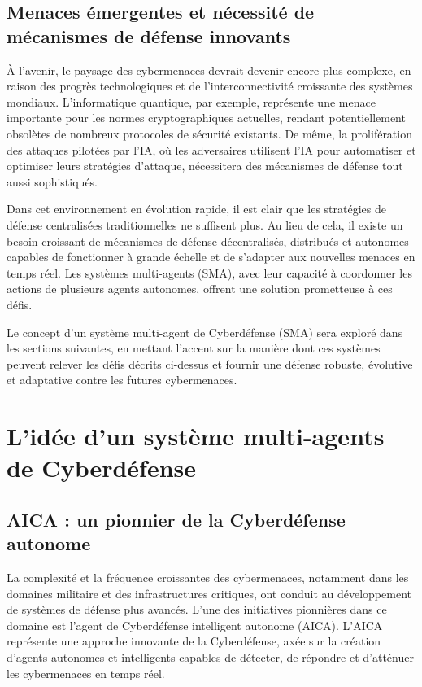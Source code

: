 \subsection{Menaces émergentes et nécessité de mécanismes de défense innovants}

À l'avenir, le paysage des cybermenaces devrait devenir encore plus complexe, en raison des progrès technologiques et de l'interconnectivité croissante des systèmes mondiaux. L'informatique quantique, par exemple, représente une menace importante pour les normes cryptographiques actuelles, rendant potentiellement obsolètes de nombreux protocoles de sécurité existants\cite{mosca2018cybersecurity}\cite{bernstein2017post}. De même, la prolifération des attaques pilotées par l'IA, où les adversaires utilisent l'IA pour automatiser et optimiser leurs stratégies d'attaque, nécessitera des mécanismes de défense tout aussi sophistiqués\cite{brundage2018malicious}.

Dans cet environnement en évolution rapide, il est clair que les stratégies de défense centralisées traditionnelles ne suffisent plus. Au lieu de cela, il existe un besoin croissant de mécanismes de défense décentralisés, distribués et autonomes capables de fonctionner à grande échelle et de s'adapter aux nouvelles menaces en temps réel. Les systèmes multi-agents (SMA), avec leur capacité à coordonner les actions de plusieurs agents autonomes, offrent une solution prometteuse à ces défis.

Le concept d'un système multi-agent de Cyberdéfense (SMA) sera exploré dans les sections suivantes, en mettant l'accent sur la manière dont ces systèmes peuvent relever les défis décrits ci-dessus et fournir une défense robuste, évolutive et adaptative contre les futures cybermenaces.


\section{L'idée d'un système multi-agents de Cyberdéfense}

\subsection{AICA : un pionnier de la Cyberdéfense autonome}

La complexité et la fréquence croissantes des cybermenaces, notamment dans les domaines militaire et des infrastructures critiques, ont conduit au développement de systèmes de défense plus avancés. L'une des initiatives pionnières dans ce domaine est l'agent de Cyberdéfense intelligent autonome (AICA). L'AICA représente une approche innovante de la Cyberdéfense, axée sur la création d'agents autonomes et intelligents capables de détecter, de répondre et d'atténuer les cybermenaces en temps réel.

